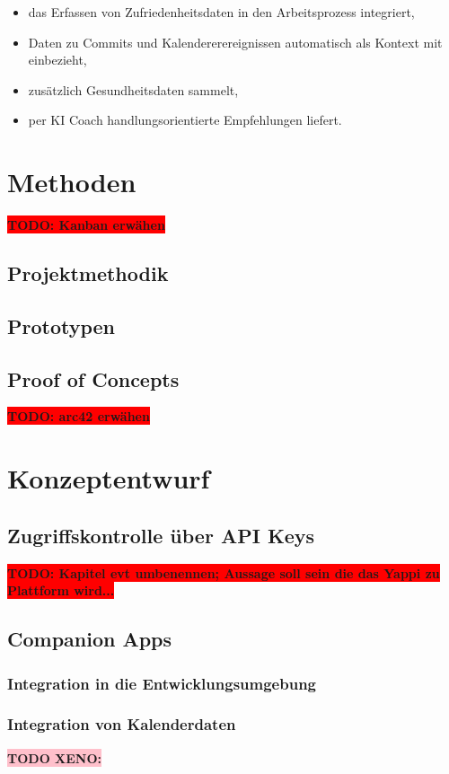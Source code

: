 \documentclass[12pt,a4paper]{report}
\newcommand{\todo}[1]{\colorbox{red}{\textbf{TODO: #1}}\\}
\newcommand{\xeno}[1]{\colorbox{pink}{\textbf{TODO XENO: #1}}\\}
\begin{document}
\begin{itemize}
  \item das Erfassen von Zufriedenheitsdaten in den Arbeitsprozess integriert,
  \item Daten zu Commits und Kalendererereignissen automatisch als Kontext mit einbezieht,
  \item zusätzlich Gesundheitsdaten sammelt,
  \item per KI Coach handlungsorientierte Empfehlungen liefert.
\end{itemize}

\chapter{Methoden}
\todo{Kanban erwähen}
\section{Projektmethodik}
\section{Prototypen}
\section{Proof of Concepts}

\todo{arc42 erwähen}

\chapter{Konzeptentwurf}
\section{Zugriffskontrolle über API Keys}

\todo{Kapitel evt umbenennen; Aussage soll sein die das Yappi zu Plattform wird...}

\section{Companion Apps}
\subsection{Integration in die Entwicklungsumgebung}
\subsection{Integration von Kalenderdaten}
\xeno{}
\end{document}
